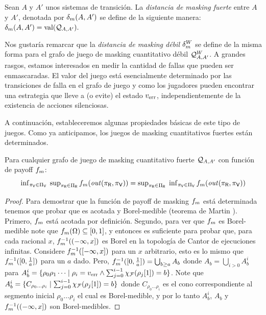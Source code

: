 \begin{definition} \label{def:mask_dist}
 Sean $A$ y $A'$ unos sistemas de transición. 
La \emph{distancia de masking fuerte} entre $A$ y $A'$, denotada por $\DeltaMask(A, A')$ se define de la siguiente manera:
$\DeltaMask(A, A') = \val(\QMStrGame).$
\end{definition}

Nos gustaría remarcar que la \emph{distancia de masking débil} $\DeltaMask^W$ se define de la misma forma para el grafo de juego de masking cuantitativo débil $\QMWeakGame$.  A grandes rasgos, estamos interesados en medir la cantidad de fallas que pueden ser enmascaradas. El valor del juego está esencialmente determinado por las transiciones de falla en el grafo de juego y como los jugadores pueden encontrar una estrategia que lleve a (o evite) el estado $\ErrorSt$, independientemente de la existencia de acciones silenciosas.

A continuación, estableceremos algunas propiedades básicas de este tipo de juegos. 
Como ya anticipamos, los juegos de masking cuantitativos fuertes están determinados.

\begin{theorem} \label{thm:mask_game_det}
  Para cualquier grafo de juego de masking cuantitativo fuerte $\QMStrGame$ con función de payoff $\FMask$:
  \[\textstyle
  \Inf_{\pi_\Verifier \in \Pi_\Verifier} \; \Sup_{\pi_\Refuter \in \Pi_\Refuter} \FMask(\out(\pi_\Refuter, \pi_\Verifier)) = \Sup_{\pi_\Refuter \in \Pi_\Refuter} \;  \Inf_{\pi_\Verifier \in \Pi_\Verifier} \FMask(\out(\pi_\Refuter, \pi_\Verifier))\]
\end{theorem}
\begin{proof} Para demostrar que la función de payoff de masking $\FMask$ está determinada tenemos que probar que es acotada y Borel-medible (teorema de Martin \cite{Martin98}). Primero, $\FMask$ está acotada por definición. Segundo, para ver que $\FMask$ es Borel-medible note que $\FMask(\Omega) \subseteq [0,1]$, y entonces es suficiente para probar que, para cada racional $x$, $\FMask^{-1}((-\infty, x])$ es Borel en la topología de Cantor de ejecuciones infinitas. 
Considere $\FMask^{-1}([-\infty,x])$ para un $x$ arbitrario, esto es lo mismo que $\FMask^{-1}([0, \frac{1}{a}])$ para un $a$ dado. Pero, $\FMask^{-1}([0, \frac{1}{a}]) = \bigcup_{b \geq a} A_b$ donde
$A_b = \bigcup_{i >0} A^i_b$ para $A^i_b = \{ \rho_0 \rho_1 \dots \mid \rho_i = \ErrorSt \wedge \sum^{i-1}_{j=0} \chi_{\Faults}(\pr{1}{\rho_j}) =b\}$. Note que 
$A^i_b = \{ C_{\rho_0 \dots \rho_i} \mid \sum^{i-1}_{j=0} \chi_{\Faults}(\pr{1}{\rho_j}) =b\}$ donde $C_{\rho_0 \dots \rho_i}$ es el cono correspondiente al segmento inicial 
$\rho_0 \dots \rho_i$ el cual es Borel-medible, y por lo tanto $A^i_b$, $A_b$ y $\FMask^{-1}((-\infty, x])$ son Borel-medibles.
\qedhere
\end{proof} \\


